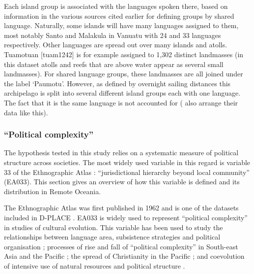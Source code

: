 \documentclass[12pt,letterpaper]{article}
\begin{document}

Each island group is associated with the languages spoken there, based on information in the various sources cited earlier for defining groups by shared language. Naturally, some islands will have many languages assigned to them, most notably Santo and Malakula in Vanuatu with 24 and 33 languages respectively. Other languages are spread out over many islands and atolls. Tuamotuan [tuam1242] is for example assigned to 1,302 distinct landmasses (in this dataset atolls and reefs that are above water appear as several small landmasses). For shared language groups, these landmasses are all joined under the label `Paumotu'. However, as defined by overnight sailing distances this archipelago is split into several different island groups each with one language. The fact that it is the same language is not accounted for (\citet{gavin2012island} also arrange their data like this).

\FloatBarrier
\subsubsection{``Political complexity''}
\label{appendix_def_pol_complex}
The hypothesis tested in this study relies on a systematic measure of political structure across societies. The most widely used variable in this regard is variable 33 of the Ethnographic Atlas \citep{EA_1971}: ``jurisdictional hierarchy beyond local community'' (EA033). This section gives an overview of how this variable is defined and its distribution in Remote Oceania. 

The Ethnographic Atlas was first published in 1962 and is one of the datasets included in D-PLACE \citep{d_place_all}. EA033 is widely used to represent ``political complexity'' in studies of cultural evolution. This variable has been used to study the relationships between language area, subsistence strategies and political organisation \citep{curriemace2009}; processes of rise and fall of ``political complexity'' in South-east Asia and the Pacific \citep{currie2010rise}; the spread of Christianity in the Pacific \citep{watts_2018}; and coevolution of intensive use of natural resources and political structure \citep{sheehan2018coevolution}.  
\end{document}
